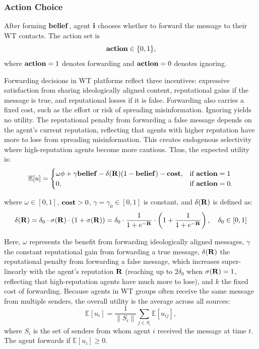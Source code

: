 \subsubsection{Action Choice}
After forming $\mathbf{belief}$, agent $\mathbf{i}$ chooses whether to forward the message to their WT contacts. The action set is
\[
\mathbf{action} \in \{0,1\},
\]
where $\mathbf{action} = 1$ denotes forwarding and $\mathbf{action} = 0$ denotes ignoring.  

Forwarding decisions in WT platforms reflect three incentives: expressive satisfaction from 
sharing ideologically aligned content, reputational gains if the message is true, and reputational 
losses if it is false. Forwarding also carries a fixed cost, such as the effort or risk of 
spreading misinformation. Ignoring yields no utility. The reputational penalty from forwarding a 
false message depends on the agent's current reputation, reflecting that agents with higher 
reputation have more to lose from spreading misinformation. This creates endogenous selectivity 
where high-reputation agents become more cautious. Thus, the expected utility is:
\begin{equation}
\mathbb{E}[u] =
\begin{cases}
\omega \phi
+ \gamma \mathbf{belief}
- \delta(\mathbf{R}) (1 - \mathbf{belief})
- \mathbf{cost}, & \text{if } \mathbf{action} = 1 \\
0, & \text{if } \mathbf{action} = 0.
\end{cases}
\end{equation}

where $\omega \in [0,1]$, $\mathbf{cost} > 0$, $\gamma = \gamma_0 \in [0,1]$ is constant, and $\delta(\mathbf{R})$ is defined as:
\begin{equation}
\delta(\mathbf{R}) = \delta_0 \cdot \sigma(\mathbf{R}) \cdot (1 + \sigma(\mathbf{R})) = \delta_0 \cdot \frac{1}{1 + e^{-\mathbf{R}}} \cdot \left(1 + \frac{1}{1 + e^{-\mathbf{R}}}\right), \quad \delta_0 \in [0,1]
\end{equation}

Here, $\omega$ represents the benefit from forwarding ideologically aligned messages, 
$\gamma$ the constant reputational gain from forwarding a true message, 
$\delta(\mathbf{R})$ the reputational penalty from forwarding a false message, which increases super-linearly with 
the agent's reputation $\mathbf{R}$ (reaching up to $2\delta_0$ when $\sigma(\mathbf{R}) = 1$, reflecting that high-reputation agents have much more to lose), 
and $k$ the fixed cost of forwarding. Because agents in WT groups often receive the same 
message from multiple senders, the overall utility is the average across all sources:
\[
\mathbb{E}[u_{i}] = \frac{1}{\|S_i\|} \sum_{j \in S_i} \mathbb{E}[u_{ij}],
\]
where $S_i$ is the set of senders from whom agent $i$ received the message at time $t$. 
The agent forwards if $\mathbb{E}[u_i] \geq 0$.


